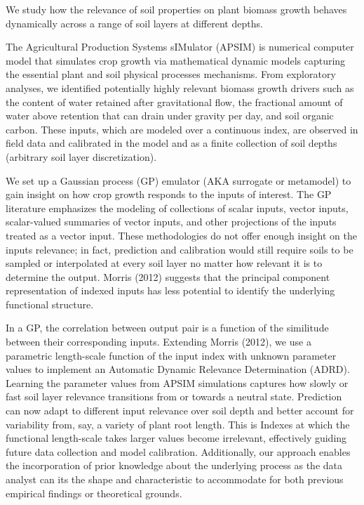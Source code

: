 
We study how the relevance of soil properties on plant biomass growth
behaves dynamically across a range of soil layers at different depths.

The Agricultural Production Systems sIMulator (APSIM) is numerical
computer model that simulates crop growth via mathematical dynamic
models capturing the essential plant and soil physical processes
mechanisms. From exploratory analyses, we identified potentially
highly relevant biomass growth drivers such as the content of water
retained after gravitational flow, the fractional amount of water
above retention that can drain under gravity per day, and soil organic
carbon. These inputs, which are modeled over a continuous index, are
observed in field data and calibrated in the model and as a finite
collection of soil depths (arbitrary soil layer discretization).

We set up a Gaussian process (GP) emulator (AKA surrogate or
metamodel) to gain insight on how crop growth responds to the inputs
of interest. The GP literature emphasizes the modeling of collections
of scalar inputs, vector inputs, scalar-valued summaries of vector
inputs, and other projections of the inputs treated as a vector
input. These methodologies do not offer enough insight on the inputs
relevance; in fact, prediction and calibration would still require
soils to be sampled or interpolated at every soil layer no matter how
relevant it is to determine the output. Morris (2012) suggests that
the principal component representation of indexed inputs has less
potential to identify the underlying functional structure.

In a GP, the correlation between output pair is a function of the
similitude between their corresponding inputs. Extending Morris
(2012), we use a parametric length-scale function of the input index
with unknown parameter values to implement an Automatic Dynamic
Relevance Determination (ADRD). Learning the parameter values from
APSIM simulations captures how slowly or fast soil layer relevance
transitions from or towards a neutral state. Prediction can now adapt
to different input relevance over soil depth and better account for
variability from, say, a variety of plant root length. This is Indexes
at which the functional length-scale takes larger values become
irrelevant, effectively guiding future data collection and model
calibration. Additionally, our approach enables the incorporation of
prior knowledge about the underlying process as the data analyst can
its the shape and characteristic to accommodate for both previous
empirical findings or theoretical grounds.

